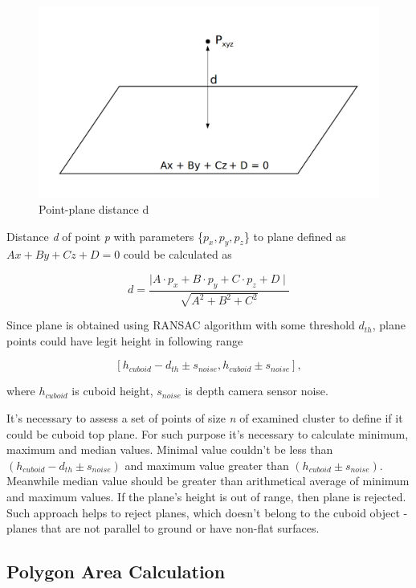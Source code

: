 \documentclass{ctuthesis}
\begin{document}
\begin{figure}[htbp]
    \centering
    \includegraphics[width=\textwidth]{point-plane-dist.png}
    \caption{Point-plane distance d}
    \label{fig:plane_dist}
\end{figure}


Distance \emph{d} of point \emph{p} with parameters \{$p_x, p_y, p_z$\} to plane defined as $Ax + By + Cz + D = 0$ could be calculated as

\[ d = \frac{\mid A \cdot p_x + B \cdot p_y + C \cdot p_z + D \mid}{\sqrt{A^2 + B^2 + C^2}} \]

Since plane is obtained using RANSAC algorithm with some threshold $d_{th}$, plane points could have legit height in following range 

\[ [h_{cuboid} - d_{th} \pm s_{noise}, h_{cuboid} \pm s_{noise}], \]

where $h_{cuboid}$ is cuboid height, $s_{noise}$ is depth camera sensor noise.

It's necessary to assess a set of points of size \emph{n} of examined cluster to define if it could be cuboid top plane. For such purpose it's necessary to calculate minimum, maximum and median values. Minimal value couldn't be less than $(h_{cuboid} - d_{th} \pm s_{noise})$ and maximum value greater than $(h_{cuboid} \pm s_{noise})$. Meanwhile median value should be greater than arithmetical average of minimum and maximum values. If the plane's height is out of range, then plane is rejected. Such approach helps to reject planes, which doesn't belong to the cuboid object - planes that are not parallel to ground or have non-flat surfaces.


\subsection{Polygon Area Calculation}
\end{document}
